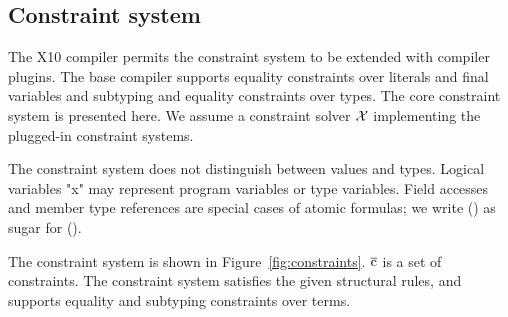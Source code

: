 \documentclass[preprint,nocopyrightspace,9pt]{sigplanconf}
\begin{document}
\subsection{
Constraint system
}


The X10 compiler permits the constraint system to be extended
with compiler plugins.  The base compiler supports equality
constraints over literals and final variables and subtyping
and equality
constraints over types.
The core constraint system is presented here.  We assume a
constraint solver ${\cal X}$ implementing the plugged-in
constraint systems.

The constraint system does not distinguish between values and
types.  Logical variables \xcd"x" may represent program variables
or type variables.  Field accesses and member type references
are special cases of atomic
formulas; we write  () as sugar for 
().

The constraint system is shown in Figure~\ref{fig:constraints}.
$\xbar{c}$ is a set of constraints.  The constraint system
satisfies the given structural rules, and supports equality and
subtyping constraints over terms.
\end{document}
